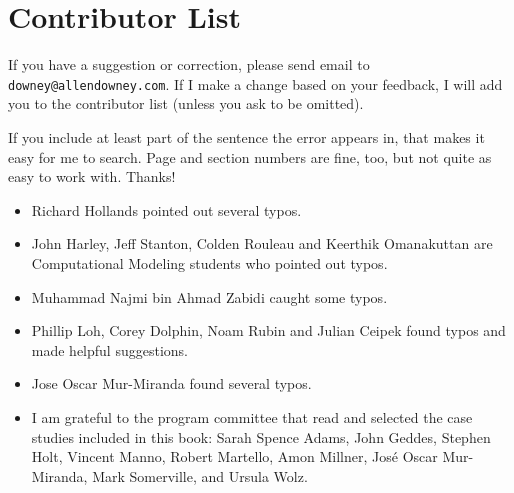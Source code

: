 \documentclass[10pt]{book}
\begin{document}
\section*{Contributor List}


If you have a suggestion or correction, please send email to
{\tt downey@allendowney.com}.  If I make a change based on your
feedback, I will add you to the contributor list
(unless you ask to be omitted).

If you include at least part of the sentence the
error appears in, that makes it easy for me to search.  Page and
section numbers are fine, too, but not quite as easy to work with.
Thanks!

\small

\begin{itemize}

\item Richard Hollands pointed out several typos.

\item John Harley, Jeff Stanton, Colden Rouleau and
Keerthik Omanakuttan are Computational Modeling students who
pointed out typos.

\item Muhammad Najmi bin Ahmad Zabidi caught some typos.

\item Phillip Loh, Corey Dolphin, Noam Rubin and Julian Ceipek
found typos and made helpful suggestions.

\item Jose Oscar Mur-Miranda found several typos.

\item I am grateful to the program committee that read and selected
the case studies included in this book: 
Sarah Spence Adams,
John Geddes,
Stephen Holt,
Vincent Manno,
Robert Martello,
Amon Millner,
Jos\'{e} Oscar Mur-Miranda,
Mark Somerville, and
Ursula Wolz.


\end{itemize}

\normalsize

\clearemptydoublepage

\begin{latexonly}

\tableofcontents

\clearemptydoublepage

\end{latexonly}
\end{document}
